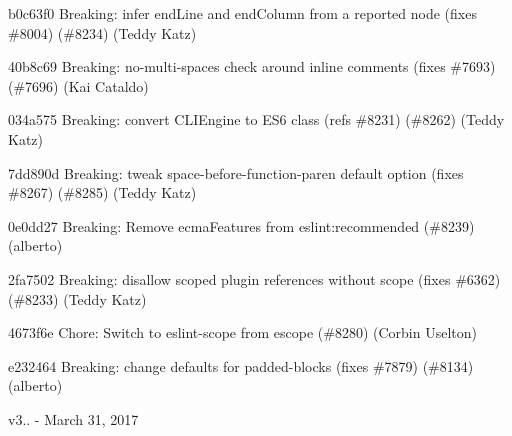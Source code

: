 \begin{DoxyItemize}
\item b0c63f0 Breaking\+: infer end\+Line and end\+Column from a reported node (fixes \#8004) (\#8234) (Teddy Katz)
\item 40b8c69 Breaking\+: no-\/multi-\/spaces check around inline comments (fixes \#7693) (\#7696) (Kai Cataldo)
\item 034a575 Breaking\+: convert C\+L\+I\+Engine to E\+S6 class (refs \#8231) (\#8262) (Teddy Katz)
\item 7dd890d Breaking\+: tweak space-\/before-\/function-\/paren default option (fixes \#8267) (\#8285) (Teddy Katz)
\item 0e0dd27 Breaking\+: Remove {\ttfamily ecma\+Features} from {\ttfamily eslint\+:recommended} (\#8239) (alberto)
\item 2fa7502 Breaking\+: disallow scoped plugin references without scope (fixes \#6362) (\#8233) (Teddy Katz)
\item 4673f6e Chore\+: Switch to eslint-\/scope from escope (\#8280) (Corbin Uselton)
\item e232464 Breaking\+: change defaults for padded-\/blocks (fixes \#7879) (\#8134) (alberto)
\end{DoxyItemize}

v3.. -\/ March 31, 2017


